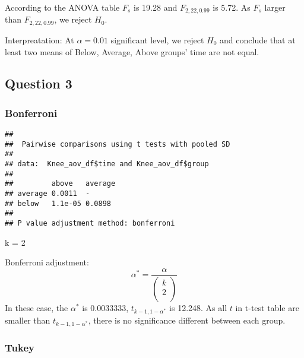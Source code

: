 \documentclass[]{article}
\newenvironment{Shaded}{\begin{snugshade}}{\end{snugshade}}
\newcommand{\KeywordTok}[1]{\textcolor[rgb]{0.13,0.29,0.53}{\textbf{#1}}}
\newcommand{\DataTypeTok}[1]{\textcolor[rgb]{0.13,0.29,0.53}{#1}}
\newcommand{\DecValTok}[1]{\textcolor[rgb]{0.00,0.00,0.81}{#1}}
\newcommand{\StringTok}[1]{\textcolor[rgb]{0.31,0.60,0.02}{#1}}
\newcommand{\OperatorTok}[1]{\textcolor[rgb]{0.81,0.36,0.00}{\textbf{#1}}}
\newcommand{\NormalTok}[1]{#1}
\begin{document}
According to the ANOVA table \(F_s\) is 19.28 and \(F_{2,22,0.99}\) is
5.72. As \(F_s\) larger than \(F_{2,22,0.99}\), we reject \(H_0\).

Interpreatation: At \(\alpha = 0.01\) significant level, we reject
\(H_0\) and conclude that at least two means of Below, Average, Above
groups' time are not equal.

\subsection{Question 3}\label{question-3-1}

\subsubsection{Bonferroni}\label{bonferroni}

\begin{Shaded}
\end{Shaded}

\begin{verbatim}
## 
##  Pairwise comparisons using t tests with pooled SD 
## 
## data:  Knee_aov_df$time and Knee_aov_df$group 
## 
##         above   average
## average 0.0011  -      
## below   1.1e-05 0.0898 
## 
## P value adjustment method: bonferroni
\end{verbatim}

\begin{Shaded}
\begin{Highlighting}[]
\NormalTok{k =}\StringTok{ }\DecValTok{2}
\end{Highlighting}
\end{Shaded}

Bonferroni adjustment:
\[\alpha^* = \frac{\alpha}{\begin{pmatrix} k \\ 2 \\ \end{pmatrix}} \]
In these case, the \(\alpha^*\) is 0.0033333, \(t_{k-1,1-{\alpha^*}}\)
is 12.248. As all \(t\) in t-test table are smaller than
\(t_{k-1,1-{\alpha^*}}\), there is no significance different between
each group.

\subsubsection{Tukey}\label{tukey}
\end{document}
